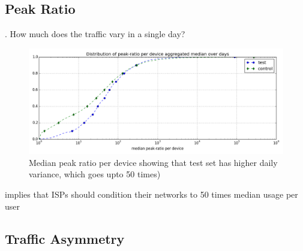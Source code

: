 



\subsection{Peak Ratio}
\label{subsec:peak-ratio}

. How much does the traffic vary in a single day?


\begin{figure}[ht!]
\begin{minipage}{0.45\linewidth}
\centering
\includegraphics[width=0.45\linewidth]{figures/peakratio-CDF-devices-MEDIAN.png}
\caption{Median peak ratio per device showing that test set has higher daily variance, which goes upto 50 times)}
\label{fig:CDF-peak-ratio-median}
\end{minipage}
\end{figure}

implies that ISPs should condition their networks to 50 times median usage per user



%
%


\subsection{Traffic Asymmetry}
\label{subsec:asymmetry}
